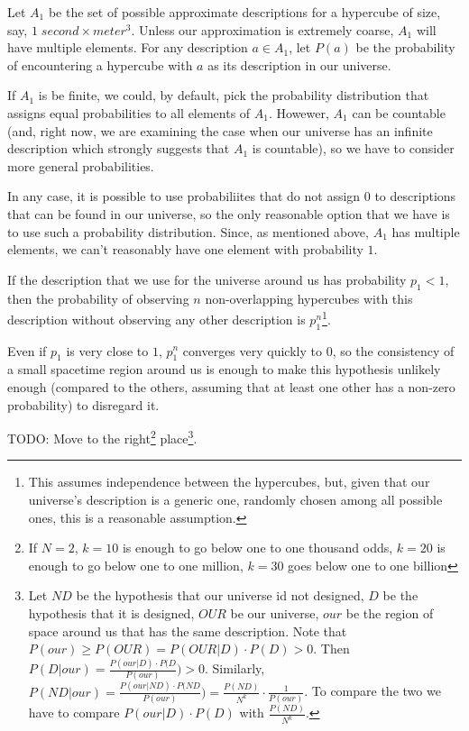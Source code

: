 \documentclass[a4paper
,draft
]{article}
\begin{document}
Let $A_1$ be the set of possible approximate descriptions for
a hypercube of size, say, $1\;second \times meter^3$.
Unless our approximation is extremely coarse, $A_1$ will have multiple elements.
For any description $a\in A_1$, let $P(a)$ be the probability of encountering
a hypercube with $a$ as its description in our universe.

If $A_1$ is be finite, we could, by default, pick the probability
distribution that assigns equal probabilities to all elements of $A_1$.
Howewer, $A_1$ can be countable (and, right now, we are examining the case when
our universe has an infinite description which strongly suggests that $A_1$
is countable), so we have to consider more general probabilities.

In any case, it is possible to use probabiliites that do not assign $0$
to descriptions that can be found in our universe, so the only reasonable
option that we have is to use such a probability distribution.
Since, as mentioned above, $A_1$ has multiple elements, we can't reasonably
have one element with probability $1$.

If the description that we use for the universe around us
has probability $p_1 < 1$, then the probability of observing $n$
non-overlapping hypercubes
with this description without observing any other description is
$p_1^n$\footnote{
  This assumes independence between the hypercubes, but, given that our
  universe's description is a generic one, randomly chosen among all possible
  ones, this is a reasonable assumption.
}.

Even if $p_1$ is very close to $1$, $p_1^n$ converges very quickly to $0$,
so the consistency of a small spacetime region around us is enough
to make this hypothesis unlikely enough (compared to the others, assuming
that at least one other has a non-zero probability) to disregard it.

TODO: Move to the right\footnote{
  If $N=2$, $k=10$ is enough to go below one to one thousand odds,
  $k=20$ is enough to go below one to one million, $k=30$ goes below one to one
  billion
  }
place\footnote{
  Let $ND$ be the hypothesis that our universe id not designed,
  $D$ be the hypothesis that it is designed, $OUR$ be our universe,
  $our$ be the region of space around us that has the same description.
  Note that $P(our) \ge P(OUR)=P(OUR|D)\cdot P(D) > 0$.
  Then $P(D|our) = \frac{P(our|D)\cdot P(D}{P(our)}) > 0$.
  Similarly,
  $P(ND|our) = \frac{P(our|ND)\cdot P(ND}{P(our)})
    = \frac{P(ND)}{N^k} \cdot \frac{1}{P(our)}$.
  To compare the two we have to compare
  $P(our|D)\cdot P(D)$ with $\frac{P(ND)}{N^k}$.
  }.
\end{document}
